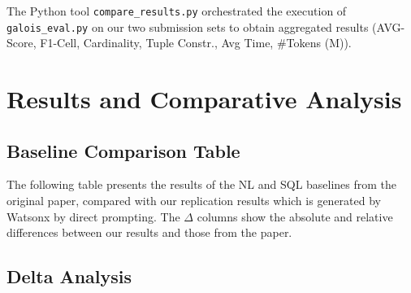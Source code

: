 \documentclass[12pt]{article}
\begin{document}
The Python tool \texttt{compare\_results.py} orchestrated the execution of \texttt{galois\_eval.py} on our two submission sets to obtain aggregated results (AVG-Score, F1-Cell, Cardinality, Tuple Constr., Avg Time, \#Tokens (M)).

\section{Results and Comparative Analysis}

\subsection{Baseline Comparison Table}

The following table presents the results of the NL and SQL baselines from the original paper, compared with our replication results which is generated by Watsonx by direct prompting. The $\Delta$ columns show the absolute and relative differences between our results and those from the paper.

\begin{table}[h!]
\centering
{}
\caption{Baseline comparison between published results and our replication.}
\end{table}


\subsection{Delta Analysis}
\end{document}
